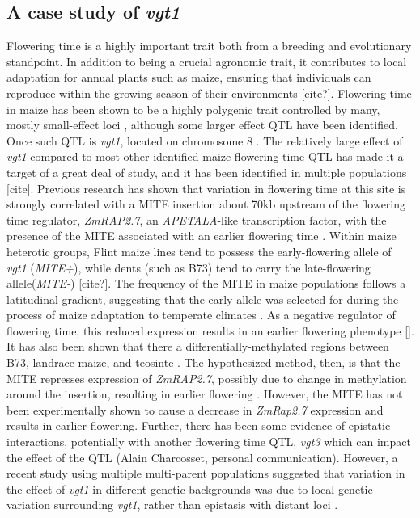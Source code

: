 \documentclass[article,9pt,twocolumn,twoside]{rilabRxiv}
\begin{document}
\subsection{A case study of \emph{vgt1}}
Flowering time is a highly important trait both from a breeding and evolutionary standpoint.
In addition to being a crucial agronomic trait, it contributes to local adaptation for annual plants such as maize, ensuring that individuals can reproduce within the growing season of their environments [cite?].
Flowering time in maize has been shown to be a highly polygenic trait controlled by many, mostly small-effect loci \cite{Buckler}, although some larger effect QTL have been identified.
Once such QTL is \emph{vgt1}, located on chromosome 8 \cite{Salvi}.
The relatively large effect of \emph{vgt1} compared to most other identified maize flowering time QTL has made it a target of a great deal of study, and it has been identified in multiple populations [cite].
Previous research  has shown that variation in flowering time at this site is strongly correlated with a MITE insertion about 70kb upstream of the flowering time regulator, \emph{ZmRAP2.7}, an \emph{APETALA}-like transcription factor, with the presence of the MITE associated with an earlier flowering time \cite{Castelletti}.
Within maize heterotic groups, Flint maize lines tend to possess the early-flowering allele of \emph{vgt1} (\emph{MITE+}), while dents (such as B73) tend to carry the late-flowering allele(\emph{MITE-}) [cite?].
The frequency of the MITE in maize populations follows a latitudinal gradient, suggesting that the early allele was selected for during the process of maize adaptation to temperate climates \cite{Navarro}.
As a negative regulator of flowering time, this reduced expression results in an earlier flowering phenotype [].
It has also been shown that there a differentially-methylated regions between B73, landrace maize, and teosinte \cite{Xu}.
The hypothesized method, then, is that the MITE represses expression of \emph{ZmRAP2.7}, possibly due to change in methylation around the insertion, resulting in earlier flowering \cite{Castelletti}.
However, the MITE has not been experimentally shown to cause a decrease in \emph{ZmRap2.7} expression and results in earlier flowering.
Further, there has been some evidence of epistatic interactions, potentially with another flowering time QTL, \emph{vgt3} which can impact the effect of the QTL (Alain Charcosset, personal communication).
However, a recent study using multiple multi-parent populations suggested that variation in the effect of \emph{vgt1} in different genetic backgrounds was due to local genetic variation surrounding \emph{vgt1}, rather than epistasis with distant loci \citep{Rio}.
\end{document}

